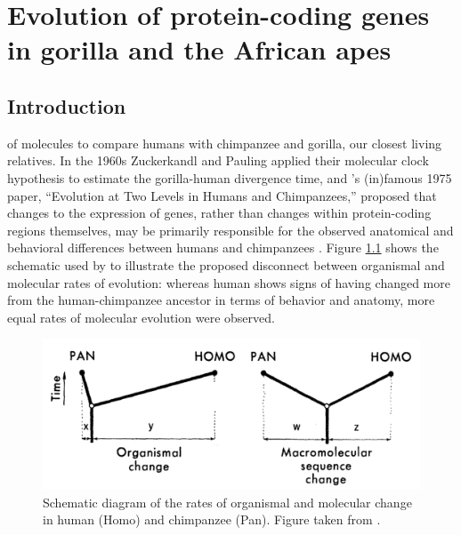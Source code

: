 \chapter{Evolution of protein-coding genes in gorilla and the African apes}
\label{ch_gorilla}
\acresetall

\section{Introduction}

of molecules to compare humans with chimpanzee and gorilla, our
closest living relatives. In the 1960s Zuckerkandl and Pauling applied
their molecular clock hypothesis to estimate the gorilla-human
divergence time, and \citeauthor{King1975}'s (in)famous 1975 paper,
``Evolution at Two Levels in Humans and Chimpanzees,'' proposed that
changes to the expression of genes, rather than changes within
protein-coding regions themselves, may be primarily responsible for
the observed anatomical and behavioral differences between humans and
chimpanzees \citep{King1975}. Figure \ref{fig_king_wilson} shows the
schematic used by \citeauthor{King1975} to illustrate the proposed
disconnect between organismal and molecular rates of evolution:
whereas human shows signs of having changed more from the
human-chimpanzee ancestor in terms of behavior and anatomy, more equal
rates of molecular evolution were observed.

\begin{figure}
\centering
\includegraphics[scale=0.35]{Figs/king_wilson.pdf}
\caption{Schematic diagram of the rates of organismal and molecular
  change in human (Homo) and chimpanzee (Pan). Figure taken from
  \citet{King1975}.}
\label{fig_king_wilson}
\end{figure}

